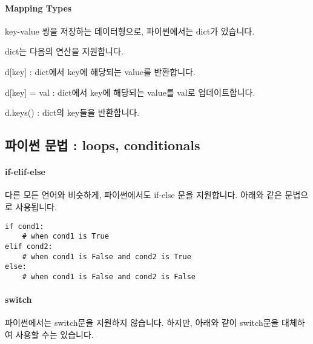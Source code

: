 \documentclass[titlepage]{report}
\begin{document}
\paragraph{Mapping Types} key-value 쌍을 저장하는 데이터형으로, 파이썬에서는 dict가 있습니다. 



dict는 다음의 연산을 지원합니다. 
\begin{compactitem} 
\item d[key] : dict에서 key에 해당되는 value를 반환합니다. 
\item d[key] = val : dict에서 key에 해당되는 value를 val로 업데이트합니다. 
\item d.keys() : dict의 key들을 반환합니다. 
\end{compactitem}




\subsection{파이썬 문법 : loops, conditionals} 

\paragraph{if-elif-else} 다른 모든 언어와 비슷하게, 파이썬에서도 if-else 문을 지원합니다. 아래와 같은 문법으로 사용됩니다. 

\begin{lstlisting}[style=python] 
if cond1:
    # when cond1 is True 
elif cond2:
    # when cond1 is False and cond2 is True
else:
    # when cond1 is False and cond2 is False
\end{lstlisting}

\paragraph{switch} 파이썬에서는 switch문을 지원하지 않습니다. 하지만, 아래와 같이 switch문을 대체하여 사용할 수는 있습니다. 


\end{document}
